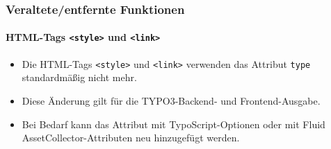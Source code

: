 %

\begin{frame}[fragile]
	\frametitle{Veraltete/entfernte Funktionen}
	\framesubtitle{HTML-Tags \texttt{<style>} und \texttt{<link>}}

	\begin{itemize}
		\item Die HTML-Tags \texttt{<style>} und \texttt{<link>} verwenden das
			Attribut \texttt{type} standardmäßig nicht mehr.
		\item Diese Änderung gilt für die TYPO3-Backend- und Frontend-Ausgabe.
		\item Bei Bedarf kann das Attribut mit TypoScript-Optionen oder mit Fluid
			AssetCollector-Attributen neu hinzugefügt werden.
	\end{itemize}

\end{frame}

